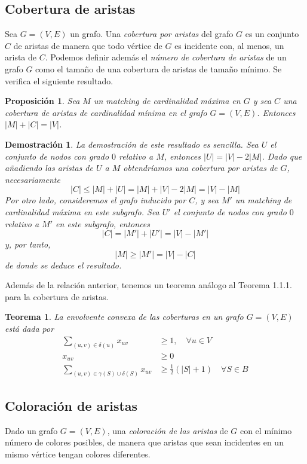 \documentclass[twoside,a4paper,openright,12pt,tikz]{book}
\newtheorem{prop}{Proposici\'on}[section]
\newtheorem{thm}{Teorema}[section]
\newtheorem*{dem}{Demostración}
\begin{document}
\subsection{Cobertura de aristas}
Sea $G=(V,E)$ un grafo. Una \textit{cobertura por aristas} del grafo $G$ es un conjunto $C$ de aristas de manera que todo vértice de $G$ es incidente con, al menos, un arista de $C$. Podemos definir además el \textit{número de cobertura de aristas} de un grafo $G$ como el tamaño de una cobertura de aristas de tamaño mínimo. Se verifica el siguiente resultado.
\begin{prop}
Sea $M$ un matching de cardinalidad máxima en $G$ y sea $C$ una cobertura de aristas de cardinalidad mínima en el grafo $G=(V,E)$. Entonces $|M|+|C|=|V|$.
\end{prop}
\begin{dem}
La demostración de este resultado es sencilla. Sea $U$ el conjunto de nodos con grado $0$ relativo a $M$, entonces $|U|=|V|-2|M|$. Dado que añadiendo las aristas de $U$ a $M$ obtendríamos una cobertura por aristas de $G$, necesariamente
$$
|C| \leq |M|+|U| = |M| + |V|-2|M| = |V|-|M|
$$
Por otro lado, consideremos el grafo inducido por $C$, y sea $M'$ un matching de cardinalidad máxima en este subgrafo. Sea $U'$ el conjunto de nodos con grado $0$ relativo a $M'$ en este subgrafo, entonces
$$
|C| = |M'| +|U'| = |V|-|M'|
$$
y, por tanto,
$$
|M| \geq |M'| = |V|-|C|
$$
de donde se deduce el resultado.
\end{dem}
Además de la relación anterior, tenemos un teorema análogo al Teorema 1.1.1. para la cobertura de aristas.
\begin{thm}
La envolvente convexa de las coberturas en un grafo $G=(V,E)$ está dada por
\begin{align*}
\sum_{(u,v)\in\delta(u)} x_{uv} &\geq 1, \quad \forall u\in V\\
x_{uv} &\geq 0\\
\sum_{(u,v)\in \gamma(S)\cup\delta(S)} x_{uv}& \geq \frac{1}{2}(|S|+1)\quad \forall S \in B	
\end{align*}
\end{thm}


\subsection{Coloración de aristas}
Dado un grafo $G=(V,E)$, una \textit{coloración de las aristas} de $G$ con el mínimo número de colores posibles, de manera que aristas que sean incidentes en un mismo vértice tengan colores diferentes. 
\end{document}
